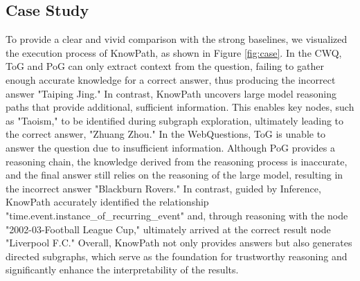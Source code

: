 \subsection{Case Study}


To provide a clear and vivid comparison with the strong baselines, we visualized the execution process of KnowPath, as shown in Figure \ref{fig:case}. 
In the CWQ, ToG and PoG can only extract context from the question, failing to gather enough accurate knowledge for a correct answer, thus producing the incorrect answer "Taiping Jing." In contrast, KnowPath uncovers large model reasoning paths that provide additional, sufficient information. This enables key nodes, such as "Taoism," to be identified during subgraph exploration, ultimately leading to the correct answer, "Zhuang Zhou."
In the WebQuestions, ToG is unable to answer the question due to insufficient information. 
Although PoG provides a reasoning chain, the knowledge derived from the reasoning process is inaccurate, and the final answer still relies on the reasoning of the large model, resulting in the incorrect answer "Blackburn Rovers."
In contrast, guided by Inference, KnowPath accurately identified the relationship "time.event.instance\_of\_recurring\_event" and, through reasoning with the node "2002-03-Football League Cup," ultimately arrived at the correct result node "Liverpool F.C."
Overall, KnowPath not only provides answers but also generates directed subgraphs, which serve as the foundation for trustworthy reasoning and significantly enhance the interpretability of the results.